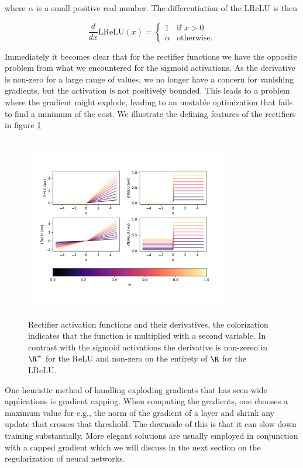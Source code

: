 \noindent where $\alpha$ is a small positive real number. The differentiation of the LReLU is then 

\begin{equation}\label{eq:lrelu}
    \frac{d}{dx}\text{LReLU} (x) = \begin{cases}
    1 & \text{if } x > 0 \\
    \alpha & \text{otherwise}.
    \end{cases}
\end{equation}

\noindent Immediately it becomes clear that for the rectifier functions we have the opposite problem from what we encountered for the sigmoid activations. As the derivative is non-zero for a large range of values, we no longer have a concern for vanishing gradients, but the activation is not positively bounded. This leads to a problem where the gradient might explode, leading to an unstable optimization that fails to find a minimum of the cost. We illustrate the defining features of the rectifiers in figure \ref{fig:elu}

\begin{figure}[ht]
\centering
\includegraphics[width=0.8\textwidth, height=8cm]{../figures/activationselus.pdf}
\caption[Rectifier activation functions]{Rectifier activation functions and their derivatives, the colorization indicates that the function is multiplied with a second variable. In contrast with the sigmoid activations the derivative is non-zereo in $\R^+$ for the ReLU and non-zero on the entirety of $\R$ for the LReLU.}\label{fig:elu}
\end{figure}

One heuristic method of handling exploding gradients that has seen wide applications is gradient capping. When computing the gradients, one chooses a maximum value for e.g., the norm of the gradient of a layer and shrink any update that crosses that threshold. The downside of this is that it can slow down training substantially. More elegant solutions are usually employed in conjunction with a capped gradient which we will discuss in the next section on the regularization of neural networks. 


